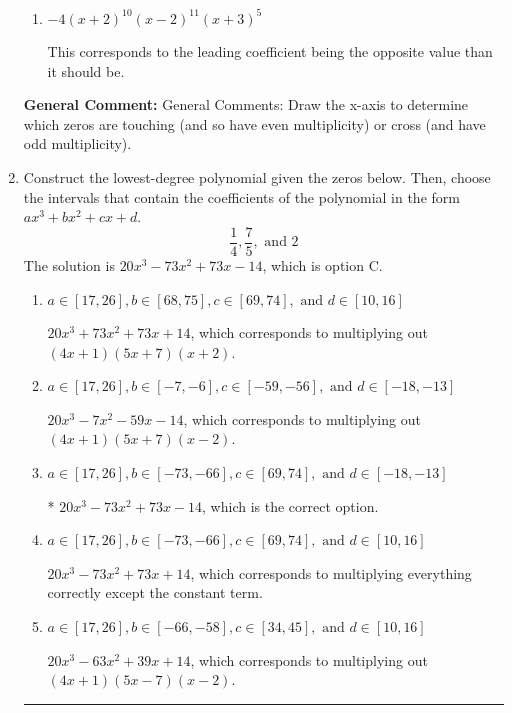 \documentclass{extbook}[14pt]
\newcommand{\litem}[1]{\item #1

\rule{\textwidth}{0.4pt}}
\begin{document}
\begin{enumerate}
{\begin{enumerate}[label=\Alph*.]
The factor $(x + 3)$ should have an odd power and the leading coefficient should be the opposite sign.
\item \( -4(x + 2)^{10} (x - 2)^{11} (x + 3)^{5} \)

This corresponds to the leading coefficient being the opposite value than it should be.
\end{enumerate}

\textbf{General Comment:} General Comments: Draw the x-axis to determine which zeros are touching (and so have even multiplicity) or cross (and have odd multiplicity).
}
\litem{
Construct the lowest-degree polynomial given the zeros below. Then, choose the intervals that contain the coefficients of the polynomial in the form $ax^3+bx^2+cx+d$.
\[ \frac{1}{4}, \frac{7}{5}, \text{ and } 2 \]The solution is \( 20x^{3} -73 x^{2} +73 x -14 \), which is option C.\begin{enumerate}[label=\Alph*.]
\item \( a \in [17, 26], b \in [68, 75], c \in [69, 74], \text{ and } d \in [10, 16] \)

$20x^{3} +73 x^{2} +73 x + 14$, which corresponds to multiplying out $(4x + 1)(5x + 7)(x + 2)$.
\item \( a \in [17, 26], b \in [-7, -6], c \in [-59, -56], \text{ and } d \in [-18, -13] \)

$20x^{3} -7 x^{2} -59 x -14$, which corresponds to multiplying out $(4x + 1)(5x + 7)(x -2)$.
\item \( a \in [17, 26], b \in [-73, -66], c \in [69, 74], \text{ and } d \in [-18, -13] \)

* $20x^{3} -73 x^{2} +73 x -14$, which is the correct option.
\item \( a \in [17, 26], b \in [-73, -66], c \in [69, 74], \text{ and } d \in [10, 16] \)

$20x^{3} -73 x^{2} +73 x + 14$, which corresponds to multiplying everything correctly except the constant term.
\item \( a \in [17, 26], b \in [-66, -58], c \in [34, 45], \text{ and } d \in [10, 16] \)

$20x^{3} -63 x^{2} +39 x + 14$, which corresponds to multiplying out $(4x + 1)(5x -7)(x -2)$.
\end{enumerate}

}
\end{enumerate}
\end{document}
